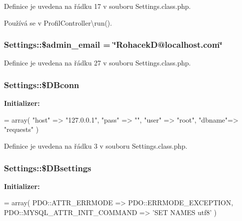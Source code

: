 Definice je uvedena na řádku 17 v souboru Settings.\-class.\-php.



Používá se v Profil\-Controller\textbackslash{}run().

\hypertarget{class_settings_af85847d3f54cbc385315fc9006892694}{
\subsubsection[{\$admin\-\_\-email}]{\setlength{\rightskip}{0pt plus 5cm}Settings\-::\$admin\-\_\-email = \char`\"{}Rohacek\-D@localhost.\-com\char`\"{}\hspace{0.3cm}{\ttfamily [static]}}}\label{class_settings_af85847d3f54cbc385315fc9006892694}


Definice je uvedena na řádku 27 v souboru Settings.\-class.\-php.

\hypertarget{class_settings_ae66c8f793cb922e441952393ff4d6168}{
\subsubsection[{\$\-D\-Bconn}]{\setlength{\rightskip}{0pt plus 5cm}Settings\-::\$\-D\-Bconn\hspace{0.3cm}{\ttfamily [static]}}}\label{class_settings_ae66c8f793cb922e441952393ff4d6168}
{\bfseries Initializer\-:}
\begin{DoxyCode}
= array(
        \textcolor{stringliteral}{"host"}  =>  \textcolor{stringliteral}{"127.0.0.1"},
        \textcolor{stringliteral}{"pass"}  =>  \textcolor{stringliteral}{""},
        \textcolor{stringliteral}{"user"}  =>  \textcolor{stringliteral}{"root"},
        \textcolor{stringliteral}{"dbname"}=>  \textcolor{stringliteral}{"requests"}
    )
\end{DoxyCode}


Definice je uvedena na řádku 3 v souboru Settings.\-class.\-php.

\hypertarget{class_settings_ad53d9811a9ab524a05cf3a1badc50b70}{
\subsubsection[{\$\-D\-Bsettings}]{\setlength{\rightskip}{0pt plus 5cm}Settings\-::\$\-D\-Bsettings\hspace{0.3cm}{\ttfamily [static]}}}\label{class_settings_ad53d9811a9ab524a05cf3a1badc50b70}
{\bfseries Initializer\-:}
\begin{DoxyCode}
= array(
            PDO::ATTR\_ERRMODE => PDO::ERRMODE\_EXCEPTION,
            PDO::MYSQL\_ATTR\_INIT\_COMMAND => \textcolor{stringliteral}{'SET NAMES utf8'}
    )
\end{DoxyCode}


